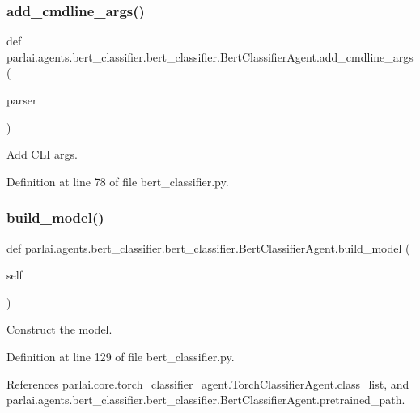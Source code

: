\subsubsection{\texorpdfstring{add\+\_\+cmdline\+\_\+args()}{add\_cmdline\_args()}}
{\footnotesize\ttfamily def parlai.\+agents.\+bert\+\_\+classifier.\+bert\+\_\+classifier.\+Bert\+Classifier\+Agent.\+add\+\_\+cmdline\+\_\+args (\begin{DoxyParamCaption}\item[{}]{parser }\end{DoxyParamCaption})\hspace{0.3cm}{\ttfamily [static]}}

\begin{DoxyVerb}Add CLI args.\end{DoxyVerb}
 

Definition at line 78 of file bert\+\_\+classifier.\+py.

\mbox{\label{classparlai_1_1agents_1_1bert__classifier_1_1bert__classifier_1_1BertClassifierAgent_a9bd6daeddde03212d67e452ef93118c4}} 
\subsubsection{\texorpdfstring{build\+\_\+model()}{build\_model()}}
{\footnotesize\ttfamily def parlai.\+agents.\+bert\+\_\+classifier.\+bert\+\_\+classifier.\+Bert\+Classifier\+Agent.\+build\+\_\+model (\begin{DoxyParamCaption}\item[{}]{self }\end{DoxyParamCaption})}

\begin{DoxyVerb}Construct the model.\end{DoxyVerb}
 

Definition at line 129 of file bert\+\_\+classifier.\+py.



References parlai.\+core.\+torch\+\_\+classifier\+\_\+agent.\+Torch\+Classifier\+Agent.\+class\+\_\+list, and parlai.\+agents.\+bert\+\_\+classifier.\+bert\+\_\+classifier.\+Bert\+Classifier\+Agent.\+pretrained\+\_\+path.

